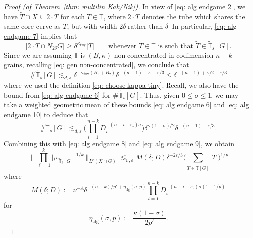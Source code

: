 \documentclass[reqno]{amsart}
\numberwithin{equation}{section}
\newcommand{\T}{\mathbb{T}}
\newcommand{\bdGamma}{\boldsymbol{\Gamma}}
\theoremstyle{plain}
\theoremstyle{definition}
\newcommand{\ttiny}{\mathrm{tiny}}
\newcommand{\alg}{\mathrm{alg}}
\begin{document}
\begin{proof}[Proof (of Theorem~\ref{thm: multilin Kak/Nik})]
In view of \eqref{eq: alg endgame 2}, we have $\widetilde{T} \cap X \subseteq 2 \cdot T$ for each $T \in \T$, where $2 \cdot T$ denotes the tube which shares the same core curve as $T$, but with width $2\delta$ rather than $\delta$. In particular, \eqref{eq: alg endgame 7} implies that
\begin{equation*}
    |2 \cdot T \cap N_{2\delta} G | \geq \delta^{\kappa_{\ttiny}} |T| \qquad \textrm{whenever $T \in \T$ is such that $\widetilde{T} \in \widetilde{\T}_s[G]$.}
\end{equation*}
Since we are assuming $\T$ is $(B,\kappa)$-non-concentrated in codimension $n-k$ grains, recalling \eqref{eq: gen non-concentrated}, we conclude that
\begin{equation}\label{eq: alg endgame 10}
    \#\widetilde{\T}_s[G] \lesssim_{d,\varepsilon}
 \delta^{-\kappa_{\ttiny} (B_1 + B_2)}\delta^{-(n-1) + \kappa - \varepsilon/3} \leq \delta^{-(n-1) + \kappa/2 - \varepsilon/3}
\end{equation}
where we used the definition \eqref{eq: choose kappa tiny}. Recall, we also have the bound from \eqref{eq: alg endgame 6} for $\#\widetilde{\T}_s[G]$. Thus, given $0 \leq \sigma \leq 1$, we may take a weighted geometric mean of these bounds \eqref{eq: alg endgame 6} and \eqref{eq: alg endgame 10} to deduce that
\begin{equation*}
  \#\widetilde{\T}_s[G]   \lesssim_{d,\varepsilon} \Big(\prod_{i = 1}^{n-k} D_i^{-(n - i -\varepsilon_{\circ})\sigma} \Big) \delta^{\kappa(1-\sigma)/2} \delta^{-(n-1) - \varepsilon/3}.
\end{equation*}
 Combining this with \eqref{eq: alg endgame 8} and \eqref{eq: alg endgame 9}, we obtain
 \begin{equation}\label{eq: alg endgame 11}
   \Big\|\prod_{\ell = 1}^k \big|\mu_{\,\widetilde{\T}_{\ell}[G]}\big|^{1/k}\Big\|_{L^p(X \cap G)}  \lesssim_{\bdGamma,\varepsilon} M(\delta; D)  \delta^{-2\varepsilon/3}\Big(\sum_{T \in \widetilde{\T}[G]}|T|\Big)^{1/p}
\end{equation}
where
\begin{equation*}
M(\delta; D) := \nu^{-A} \delta^{-(n-k)/p' + \eta_{\alg}(\sigma,p)} \prod_{i = 1}^{n-k} D_i^{-(n - i -\varepsilon_{\circ})\sigma(1-1/p)}
\end{equation*}
for
\begin{equation*}
    \eta_{\alg}(\sigma,p) := \frac{\kappa(1-\sigma)}{2p'}.
\end{equation*}
 

\end{proof}
\end{document}
